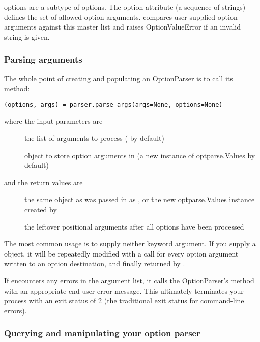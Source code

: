  options are a subtype of  options.  The 
option attribute (a sequence of strings) defines the set of allowed
option arguments.   compares
user-supplied option arguments against this master list and raises
OptionValueError if an invalid string is given.


\subsubsection{Parsing arguments\label{optparse-parsing-arguments}}

The whole point of creating and populating an OptionParser is to call
its  method:
\begin{verbatim}
(options, args) = parser.parse_args(args=None, options=None)
\end{verbatim}

where the input parameters are
\begin{description}
\item[]
the list of arguments to process ( by default)
\item[]
object to store option arguments in (a new instance of
optparse.Values by default)
\end{description}

and the return values are
\begin{description}
\item[]
the same object as was passed in as , or the new
optparse.Values instance created by 
\item[]
the leftover positional arguments after all options have been
processed
\end{description}

The most common usage is to supply neither keyword argument.  If you
supply a  object, it will be repeatedly modified with a
 call for every option argument written to an option
destination, and finally returned by .

If  encounters any errors in the argument list, it calls
the OptionParser's  method with an appropriate end-user error
message.  This ultimately terminates your process with an exit status of
2 (the traditional \UNIX{} exit status for command-line errors).


\subsubsection{Querying and manipulating your option parser\label{optparse-querying-manipulating-option-parser}}

